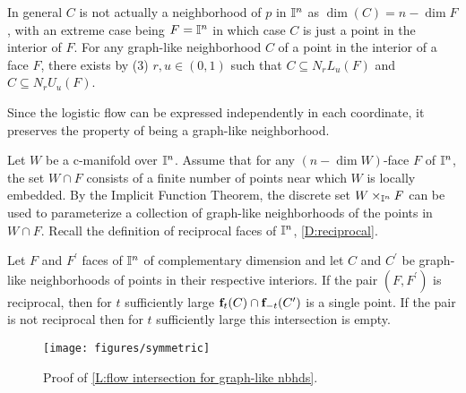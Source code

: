 In general $C$ is not actually a neighborhood of $p$ in $\mathbb{I}^n$ as $\dim(C)=n-\dim F$, with an extreme case being $F =\mathbb{I}^n$ in which case $C$ is just a point in the interior of $F$.
For any graph-like neighborhood $C$ of a point in the interior of a face $F$, there exists by (3) $r, u \in (0,1)$ such that $C \subseteq N_rL_u(F)$ and $C \subseteq N_rU_u(F)$.

Since the logistic flow can be expressed independently in each coordinate, it preserves the property of being a graph-like neighborhood.

Let $W$ be a c-manifold over $\mathbb{I}^n$.
Assume that for any $(n-\dim W)$-face $F$ of $\mathbb{I}^n$, the set $W \cap F$ consists of a finite number of points near which $W$ is locally embedded.
By the Implicit Function Theorem, the discrete set $W \times_{\mathbb{I}^n} F$ can be used to parameterize a collection of graph-like neighborhoods of the points in $W \cap F$.
Recall the definition of reciprocal faces of $\mathbb{I}^n$, \cref{D:reciprocal}.

\begin{lemma}\label{L:flow intersection for graph-like nbhds}
	Let $F$ and $F^\prime$ faces of $\mathbb{I}^n$ of complementary dimension and let $C$ and $C^\prime$ be graph-like neighborhoods of points in their respective interiors.
	If the pair $(F,F^\prime)$ is reciprocal, then for $t$ sufficiently large $\mathbf{f}_t(C) \cap \mathbf{f}_{-t}(C^\prime)$ is a single point.
	If the pair is not reciprocal then for $t$ sufficiently large this intersection is empty.
\end{lemma}

\begin{figure}[!h]
	\texttt{[image: figures/symmetric]}
	\caption{Proof of \cref{L:flow intersection for graph-like nbhds}.}
	\label{F:intersection}
\end{figure}

